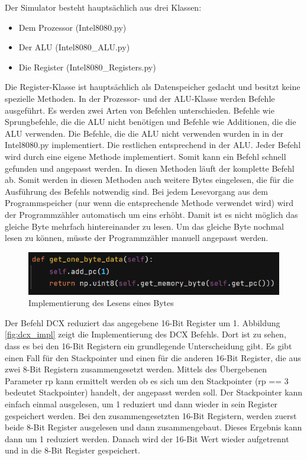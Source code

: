 \documentclass[12pt]{article}
\newcommand{\imgSpaceBefore}{\vspace{10pt}}
\begin{document}
Der Simulator besteht hauptsächlich aus drei Klassen:

\begin{itemize}
\item Dem Prozessor (Intel8080.py)
\item Der ALU (Intel8080\_ALU.py)
\item Die Register (Intel8080\_Registers.py)
\end{itemize} 

\noindent
Die Register-Klasse ist hauptsächlich als Datenspeicher gedacht und besitzt keine spezielle Methoden. In der Prozessor- und der ALU-Klasse werden Befehle ausgeführt. Es werden zwei Arten von Befehlen unterschieden. Befehle wie Sprungbefehle, die die ALU nicht benötigen und Befehle wie Additionen, die die ALU verwenden. 
Die Befehle, die die ALU nicht verwenden wurden in in der Intel8080.py implementiert. Die restlichen entsprechend in der ALU. Jeder Befehl wird durch eine eigene Methode implementiert. Somit kann ein Befehl schnell gefunden und angepasst werden. In diesen Methoden läuft der komplette Befehl ab. Somit werden in diesen Methoden auch weitere Bytes eingelesen, die für die Ausführung des Befehls notwendig sind.
Bei jedem Lesevorgang aus dem Programmspeicher (nur wenn die entsprechende Methode verwendet wird) wird der Programmzähler automatisch um eins erhöht. Damit ist es nicht möglich das gleiche Byte mehrfach hintereinander zu lesen. Um das gleiche Byte nochmal lesen zu können, müsste der Programmzähler manuell angepasst werden.\imgSpaceBefore

\begin{figure}[h]
\centering
\includegraphics[width=15cm]{Bilder/GetOneByteData}
\caption{Implementierung des Lesens eines Bytes}
\label{fig:GetOneByteData}
\end{figure}

\noindent
Der Befehl DCX reduziert das angegebene 16-Bit Register um 1. 
Abbildung \ref{fig:dcx_impl} zeigt die Implementierung des DCX Befehls. 
Dort ist zu sehen, dass es bei den 16-Bit Registern ein grundlegende Unterscheidung gibt. Es gibt einen Fall für den Stackpointer und einen für die anderen 16-Bit Register, die aus zwei 8-Bit Registern zusammengesetzt werden. Mittels des Übergebenen Parameter rp kann ermittelt werden ob es sich um den Stackpointer (rp  == 3 bedeutet Stackpointer) handelt, der angepasst werden soll. 
Der Stackpointer kann einfach einmal ausgelesen, um 1 reduziert und dann wieder in sein Register gespeichert werden.
Bei den zusammengesetzten 16-Bit Registern, werden zuerst beide 8-Bit Register ausgelesen und dann zusammengebaut. Dieses Ergebnis kann dann um 1 reduziert werden. Danach wird der 16-Bit Wert wieder aufgetrennt und in die 8-Bit Register gespeichert. 
\end{document}
